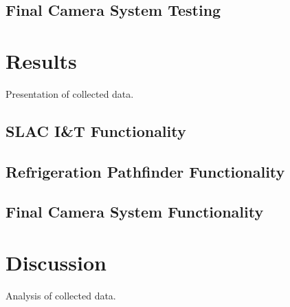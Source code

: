 \subsection{Final Camera System Testing} 

\vspace{5mm}
\section{Results}
Presentation of collected data.
\subsection{SLAC I\&T Functionality}
\subsection{Refrigeration Pathfinder Functionality}
\subsection{Final Camera System Functionality} 

\vspace{5mm}
\section{Discussion}
Analysis of collected data.
